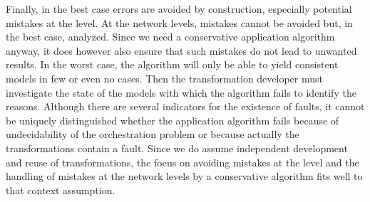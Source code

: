 Finally, in the best case errors are avoided by construction, especially potential mistakes at the \leveltransformation level.
At the network levels, mistakes cannot be avoided but, in the best case, analyzed.
Since we need a conservative application algorithm anyway, it does however also ensure that such mistakes do not lead to unwanted results.
In the worst case, the algorithm will only be able to yield consistent models in few or even no cases.
Then the transformation developer must investigate the state of the models with which the algorithm fails to identify the reasons.
Although there are several indicators for the existence of faults, it cannot be uniquely distinguished whether the application algorithm fails because of undecidability of the orchestration problem or because actually the transformations contain a fault.
Since we do assume independent development and reuse of transformations, the focus on avoiding mistakes at the \leveltransformation level and the handling of mistakes at the network levels by a conservative algorithm fits well to that context assumption.





